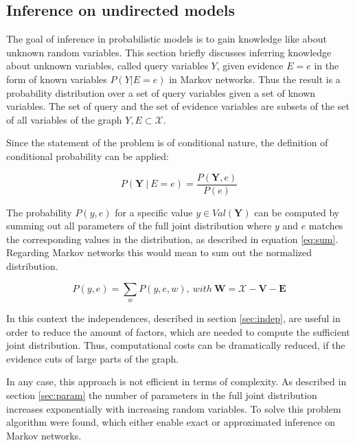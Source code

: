 \subsection{Inference on undirected models} \label{sec:infer}

The goal of inference in probabilistic models is to gain knowledge like about unknown random variables. This section briefly discusses inferring knowledge about unknown variables, called query variables $Y$, given evidence $E=e$ in the form of known variables $P(Y|E=e)$ in Markov networks. Thus the result is a probability distribution over a set of query variables given a set of known variables. The set of query and the set of evidence variables are subsets of the set of all variables of the graph $Y,E \subset \mathcal{X}$.

Since the statement of the problem is of conditional nature, the definition of conditional probability can be applied:

\begin{equation}
P(\mathbf{Y}\ |\ E=e)=\frac{P(\mathbf{Y},e)}{P(e)}
\end{equation}

The probability $P(y,e)$ for a specific value $y \in Val(\mathbf{Y})$ can be computed by summing out all parameters of the full joint distribution where $y$ and $e$ matches the corresponding values in the distribution, as described in equation \ref{eq:sum}. Regarding Markov networks this would mean to sum out the normalized distribution.

\begin{equation}
P(y,e)=\sum_w{P(y,e,w)},\ with\ \mathbf{W} = \mathcal{X} - \mathbf{V} - \mathbf{E}
\label{eq:sum}
\end{equation}

In this context the independences, described in section \ref{sec:indep}, are useful in order to reduce the amount of factors, which are needed to compute the sufficient joint distribution. Thus, computational costs can be dramatically reduced, if the evidence cuts of large parts of the graph.

In any case, this approach is not efficient in terms of complexity. As described in section \ref{sec:param} the number of parameters in the full joint distribution increases exponentially with increasing random variables. To solve this problem algorithm were found, which either enable exact or approximated inference on Markov networks.

